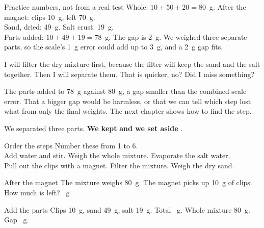 \begin{worked}{Practice numbers, not from a real test}
Whole: $10+50+20=80$~g. After the magnet: clips 10~g, left 70~g.\\
Sand, dried: 49~g. Salt crust: 19~g.\\
Parts added: $10+49+19=78$~g. The gap is 2~g. We weighed three separate parts, so the scale's 1~g error could add up to 3~g, and a 2~g gap fits.
\end{worked}

\begin{multix}[hmm]\multixbot[hmm]\tcblower
I will filter the dry mixture first, because the filter will keep the sand and the salt together. Then I will separate them. That is quicker, no? Did I miss something?
\end{multix}

{The parts added to 78~g against 80~g, a gap smaller than the combined scale error.}
{That a bigger gap would be harmless, or that we can tell which step lost what from only the final weights. The next chapter shows how to find the step.}

\begin{keepbox}
We separated three parts. \textbf{We kept} \wline[3.4cm] \textbf{and we set aside} \wline[3.4cm].
\end{keepbox}

\clearpage

\begin{puzzle}{Order the steps}
Number these from 1 to 6.\\
\wline[1cm] Add water and stir. \quad \wline[1cm] Weigh the whole mixture. \quad \wline[1cm] Evaporate the salt water.\\
\wline[1cm] Pull out the clips with a magnet. \quad \wline[1cm] Filter the mixture. \quad \wline[1cm] Weigh the dry sand.
\end{puzzle}

\begin{puzzle}{After the magnet}
The mixture weighs 80~g. The magnet picks up 10~g of clips. How much is left? \wline[1.6cm]~g
\end{puzzle}

\begin{puzzle}{Add the parts}
Clips 10~g, sand 49~g, salt 19~g. Total \wline[1.6cm]~g. Whole mixture 80~g. Gap \wline[1.6cm]~g.
\end{puzzle}

